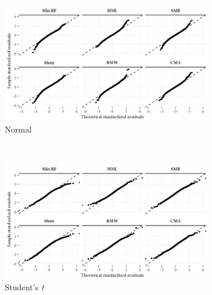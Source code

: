 \begin{figure}[!pt]
  \centering
  \caption{QQ plots of standardized residuals \\ \quad \\ Quantile-quantile plots of theoretical standardized residuals and standardized residuals from the best (lowest BIC) ARMA-GARCH model specifications, with normal, Student's and skewed Student's t innovations. Data from the theoretical distribution should line up on the dashed line. Based on weekly data 1963-2016.}
  \begin{subfigure}{0.70\textwidth}
    \includegraphics[width=\textwidth]{graphics/qq_norm.png}
    \caption{Normal}
  \end{subfigure}
  \\
  \begin{subfigure}{0.70\textwidth}
    \includegraphics[width=\textwidth]{graphics/qq_std.png}
    \caption{Student's \textit{t}}
  \end{subfigure}
  \\
  \begin{subfigure}{0.70\textwidth}

\end{subfigure}
\end{figure}
